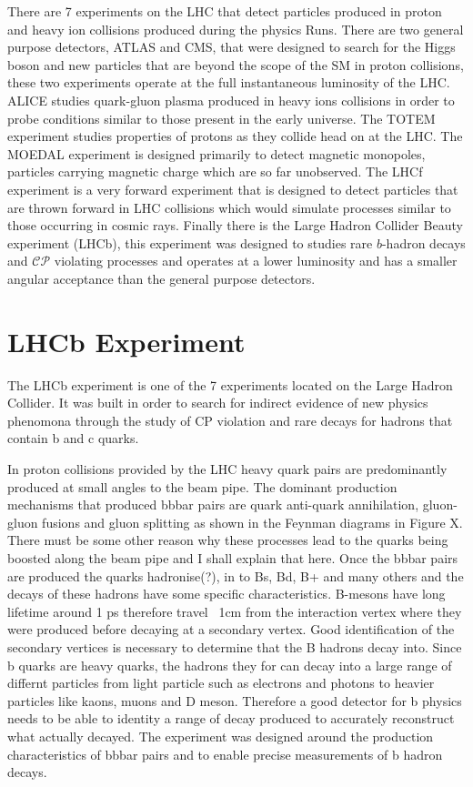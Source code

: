 There are 7 experiments on the LHC that detect particles produced in proton and heavy ion collisions produced during the physics Runs. There are two general purpose detectors, ATLAS and CMS, that were designed to search for the Higgs boson and new particles that are beyond the scope of the SM in proton collisions, these two experiments operate at the full instantaneous luminosity of the LHC. %
ALICE studies quark-gluon plasma produced in heavy ions collisions in order to probe conditions similar to those present in the early universe. The TOTEM experiment studies properties of protons as they collide head on at the LHC. The MOEDAL experiment is designed primarily to detect magnetic monopoles, particles carrying magnetic charge which are so far unobserved. The LHCf experiment is a very forward experiment that is designed to detect particles that are thrown forward in LHC collisions which would simulate processes similar to those occurring in cosmic rays. Finally there is the Large Hadron Collider Beauty experiment (LHCb), this experiment was designed to studies rare $b$-hadron decays and $\mathcal{CP}$ violating processes and operates at a lower luminosity and has a smaller angular acceptance than the general purpose detectors. %




\section{LHCb Experiment}
\label{LHCb}
The LHCb experiment is one of the 7 experiments located on the Large Hadron Collider. It was built in order to search for indirect evidence of new physics phenomona through the study of CP violation and rare decays for hadrons that contain b and c quarks.

In proton collisions provided by the LHC heavy quark pairs are predominantly produced at small angles to the beam pipe. The dominant production mechanisms that produced bbbar pairs are quark anti-quark annihilation, gluon-gluon fusions and  gluon splitting as shown in the Feynman diagrams in Figure X. There must be some other reason why these processes lead to the quarks being boosted along the beam pipe and I shall explain that here. Once the bbbar pairs are produced the quarks hadronise(?), in to Bs, Bd, B+ and many others and the decays of these hadrons have some specific characteristics. B-mesons have long lifetime around 1 ps therefore travel ~1cm from the interaction vertex where they were produced before decaying at a secondary vertex. Good identification of the secondary vertices is necessary to determine that the B hadrons decay into. Since b quarks are heavy quarks, the hadrons they for can decay into a large range of differnt particles from light particle such as electrons and photons to heavier particles like kaons, muons and D meson. Therefore a good detector for b physics needs to be able to identity a range of decay produced to accurately reconstruct what actually decayed. The experiment was designed around the production characteristics of bbbar pairs and to enable precise measurements of b hadron decays. 

